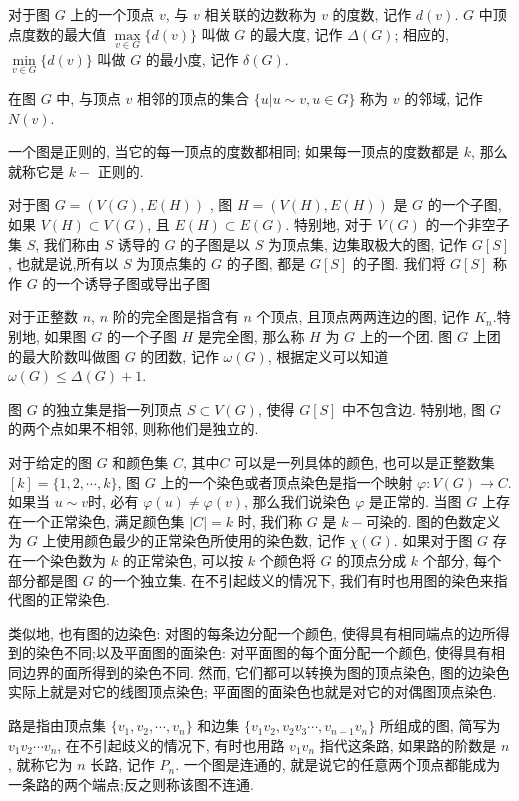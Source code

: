 \documentclass[12pt,a4paper]{article}%
\begin{document}
对于图 $G$ 上的一个顶点 $v$, 与 $v$ 相关联的边数称为 $v$ 的度数, 记作 $d(v)$. $G$ 中顶点度数的最大值 $\max\limits_{v \in G}\{d(v)\}$ 叫做 $G$ 的最大度, 记作 $\Delta(G)$; 相应的, $\min\limits_{v \in G}\{d(v)\}$ 叫做 $G$ 的最小度, 记作 $\delta(G)$. 

在图 $G$ 中, 与顶点 $v$ 相邻的顶点的集合 $\{u|u \sim v, u \in G\}$ 称为 $v$ 的邻域, 记作 $N(v)$.

一个图是正则的, 当它的每一顶点的度数都相同; 如果每一顶点的度数都是 $k$, 那么就称它是 $k-$ 正则的.

对于图 $G = (V(G),E(H))$ , 图 $H = (V(H),E(H))$ 是 $G$ 的一个子图, 如果 $V(H) \subset V(G)$, 且 $E(H) \subset E(G)$. 特别地, 对于 $V(G)$ 的一个非空子集 $S$, 我们称由 $S$ 诱导的 $G$ 的子图是以 $S$ 为顶点集, 边集取极大的图, 记作 $G[S]$, 也就是说,所有以 $S$ 为顶点集的 $G$ 的子图, 都是 $G[S]$ 的子图. 我们将 $G[S]$ 称作 $G$ 的一个诱导子图或导出子图

对于正整数 $n$, $n$ 阶的完全图是指含有 $n$ 个顶点, 且顶点两两连边的图, 记作 $K_n$.特别地, 如果图 $G$ 的一个子图 $H$ 是完全图, 那么称 $H$ 为 $G$ 上的一个团. 图 $G$ 上团的最大阶数叫做图 $G$ 的团数, 记作 $\omega(G)$, 根据定义可以知道 $\omega(G) \leq \Delta(G)+1$.

图 $G$ 的独立集是指一列顶点 $S \subset V(G)$, 使得 $G[S]$ 中不包含边. 特别地, 图 $G$ 的两个点如果不相邻, 则称他们是独立的.

对于给定的图 $G$ 和颜色集 $C$, 其中$C$ 可以是一列具体的颜色, 也可以是正整数集 $[k] = \{1,2,\cdots,k\}$, 图 $G$ 上的一个染色或者顶点染色是指一个映射 $\varphi : V(G) \rightarrow C$.  如果当 $u \sim v$时, 必有 $\varphi(u) \neq \varphi(v)$, 那么我们说染色 $\varphi$ 是正常的. 当图 $G$ 上存在一个正常染色, 满足颜色集 $|C| = k$ 时, 我们称 $G$ 是 $k-$可染的. 图的色数定义为 $G$ 上使用颜色最少的正常染色所使用的染色数, 记作 $\chi(G)$. 如果对于图 $G$ 存在一个染色数为 $k$ 的正常染色, 可以按 $k$ 个颜色将 $G$ 的顶点分成 $k$ 个部分, 每个部分都是图 $G$ 的一个独立集. 在不引起歧义的情况下, 我们有时也用图的染色来指代图的正常染色.

类似地, 也有图的边染色: 对图的每条边分配一个颜色, 使得具有相同端点的边所得到的染色不同;以及平面图的面染色: 对平面图的每个面分配一个颜色, 使得具有相同边界的面所得到的染色不同. 然而, 它们都可以转换为图的顶点染色, 图的边染色实际上就是对它的线图顶点染色; 平面图的面染色也就是对它的对偶图顶点染色.

路是指由顶点集 $\{v_1,v_2,\cdots,v_n\}$ 和边集 $\{v_1v_2,v_2v_3\cdots,v_{n-1}v_n\}$ 所组成的图, 简写为 $v_1 v_2 \cdots v_n$, 在不引起歧义的情况下, 有时也用路 $v_1v_n$ 指代这条路, 如果路的阶数是 $n$, 就称它为 $n$ 长路, 记作 $P_n$. 一个图是连通的, 就是说它的任意两个顶点都能成为一条路的两个端点;反之则称该图不连通.
\end{document}
